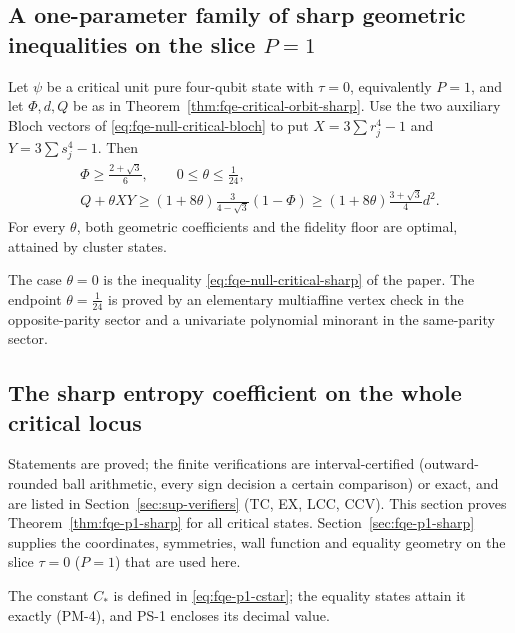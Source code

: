 \subsection{A one-parameter family of sharp geometric inequalities on the slice $P=1$}\label{sec:sup-nullsharp}
\begin{theorem}[Sharper geometric family on $P=1$; MS]\label{thm:sup-null-family}
Let $\psi$ be a critical unit pure four-qubit state with $\tau=0$, equivalently $P=1$, and let $\Phi,d,Q$ be as in
Theorem~\ref{thm:fqe-critical-orbit-sharp}. Use the two auxiliary Bloch vectors of \eqref{eq:fqe-null-critical-bloch} to put
$X=3\sum r_j^4-1$ and $Y=3\sum s_j^4-1$. Then
\begin{equation}\label{eq:fqe-null-critical-family}
 \begin{gathered}
 \Phi\ge\frac{2+\sqrt3}{6},\qquad 0\le\theta\le\frac1{24},\\
 Q+\theta XY\ge(1+8\theta)\frac3{4-\sqrt3}(1-\Phi)
       \ge(1+8\theta)\frac{3+\sqrt3}{4}d^2.
 \end{gathered}
\end{equation}
For every $\theta$, both geometric coefficients and the fidelity floor are optimal, attained by cluster states.
\end{theorem}
The case $\theta=0$ is the inequality \eqref{eq:fqe-null-critical-sharp} of the paper. The endpoint $\theta=\tfrac1{24}$ is proved by
an elementary multiaffine vertex check in the opposite-parity sector and a univariate polynomial minorant in the same-parity sector.



\subsection{The sharp entropy coefficient on the whole critical locus}
\label{sec:fqe-critical-sharp}
Statements are proved; the finite verifications are interval-certified (outward-rounded ball arithmetic, every sign
decision a certain comparison) or exact, and are listed in Section~\ref{sec:sup-verifiers} (TC, EX, LCC, CCV).
This section proves Theorem~\ref{thm:fqe-p1-sharp} for all critical states.
Section~\ref{sec:fqe-p1-sharp} supplies the coordinates, symmetries, wall function and equality geometry on the slice
$\tau=0$ ($P=1$) that are used here.

The constant $C_*$ is defined in \eqref{eq:fqe-p1-cstar}; the equality states attain it exactly (PM-4), and PS-1 encloses its decimal value.

